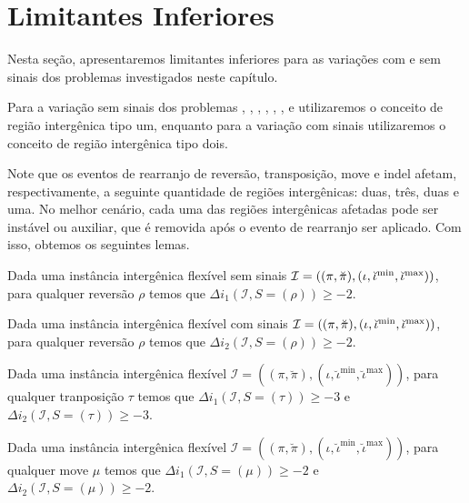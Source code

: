 \section{Limitantes Inferiores}

Nesta seção, apresentaremos limitantes inferiores para as variações com e sem sinais dos problemas investigados neste capítulo.

Para a variação sem sinais dos problemas \SbFIR{}, \SbFIRI{}, \SbFIRM{}, \SbFIRMI{}, \SbFIRT{}, \SbFIRTI{}, \SbFIRTM{} e  \SbFIRTMI{} utilizaremos o conceito de região intergênica tipo um, enquanto para a variação com sinais utilizaremos o conceito de região intergênica tipo dois.

Note que os eventos de rearranjo de reversão, transposição, move e indel afetam, respectivamente, a seguinte quantidade de regiões intergênicas: duas, três, duas e uma. No melhor cenário, cada uma das regiões intergênicas afetadas pode ser instável ou auxiliar, que é removida após o evento de rearranjo ser aplicado. Com isso, obtemos os seguintes lemas.

\begin{lemma}\label{lemma:VJKGLBQG}
Dada uma instância intergênica flexível sem sinais $\mathcal{I} = ((\pi,\breve\pi),(\iota,\breve\iota^{\min},\break\breve\iota^{\max}))$, para qualquer reversão $\rho$ temos que $\Delta i_1(\mathcal{I}, S = (\rho)) \ge -2$.
\end{lemma}

\begin{lemma}\label{lemma:HJTCKDGV}
Dada uma instância intergênica flexível com sinais $\mathcal{I} = ((\pi,\breve\pi),(\iota,\breve\iota^{\min},\break\breve\iota^{\max}))$, para qualquer reversão $\rho$ temos que $\Delta i_2(\mathcal{I}, S = (\rho)) \ge -2$.
\end{lemma}

\begin{lemma}\label{lemma:XLUTQDGV}
Dada uma instância intergênica flexível $\mathcal{I} = ((\pi,\breve\pi),(\iota,\breve\iota^{\min},\breve\iota^{\max}))$, para qualquer tranposição $\tau$ temos que $\Delta i_1(\mathcal{I}, S = (\tau)) \ge -3$ e $\Delta i_2(\mathcal{I}, S = (\tau)) \ge -3$.
\end{lemma}

\begin{lemma}\label{lemma:ZOCGWWGV}
Dada uma instância intergênica flexível $\mathcal{I} = ((\pi,\breve\pi),(\iota,\breve\iota^{\min},\breve\iota^{\max}))$, para qualquer move $\mu$ temos que $\Delta i_1(\mathcal{I}, S = (\mu)) \ge -2$ e $\Delta i_2(\mathcal{I}, S = (\mu)) \ge -2$.
\end{lemma}

